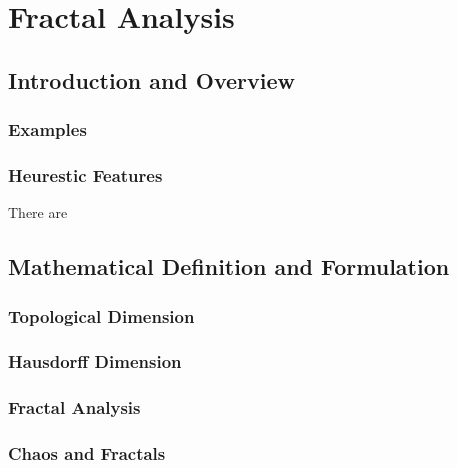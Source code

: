 
\chapter{Fractal Analysis} %

\label{Chapter4} %


\section{Introduction and Overview}

\subsection{Examples}

\subsection{Heurestic Features}
There are \autocite{edgar}
\section{Mathematical Definition and Formulation}
\subsection{Topological Dimension}
\subsection{Hausdorff Dimension}
\subsection{Fractal Analysis}
\subsection{Chaos and Fractals}

